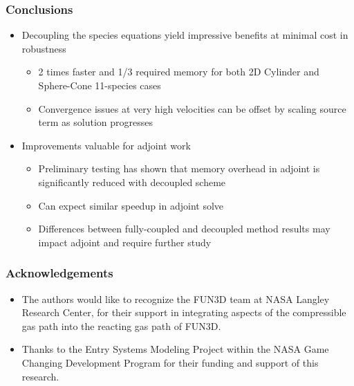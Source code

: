 \documentclass{beamer}
\begin{document}
\begin{frame}
  \frametitle{Conclusions}
  \begin{itemize}
    \item Decoupling the species equations yield impressive benefits at minimal cost in robustness
      \begin{itemize}
        \item 2 times faster and 1/3 required memory for both 2D Cylinder and
          Sphere-Cone 11-species cases
        \item Convergence issues at very high velocities can be offset by
          scaling source term as solution progresses
      \end{itemize}
      \item Improvements valuable for adjoint work
        \begin{itemize}
          \item Preliminary testing has shown that memory overhead in adjoint is
            significantly reduced with decoupled scheme
          \item Can expect similar speedup in adjoint solve
          \item Differences between fully-coupled and decoupled method results
            may impact adjoint and require further study
        \end{itemize}
  \end{itemize}
\end{frame}
\begin{frame}
  \frametitle{Acknowledgements}
  \begin{itemize}
    \item The authors would like to recognize the FUN3D team at NASA
     Langley Research Center, for their support in integrating aspects of the
     compressible gas path into the reacting gas path of FUN3D.
   \item Thanks to the Entry Systems Modeling Project within the NASA
     Game Changing Development Program for their funding and support of this research.  
  \end{itemize}
\end{frame}
\end{document}
